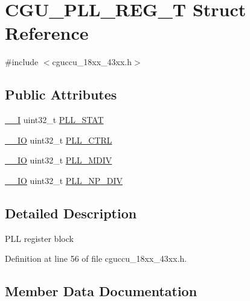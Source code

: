 \hypertarget{struct_c_g_u___p_l_l___r_e_g___t}{}\section{C\+G\+U\+\_\+\+P\+L\+L\+\_\+\+R\+E\+G\+\_\+T Struct Reference}
\label{struct_c_g_u___p_l_l___r_e_g___t}


{\ttfamily \#include $<$cguccu\+\_\+18xx\+\_\+43xx.\+h$>$}

\subsection*{Public Attributes}
\begin{DoxyCompactItemize}
\item 
\hyperlink{core__sc300_8h_af63697ed9952cc71e1225efe205f6cd3}{\+\_\+\+\_\+I} uint32\+\_\+t \hyperlink{struct_c_g_u___p_l_l___r_e_g___t_ae0ecd7bd027d8befd5feadd3ec410c52}{P\+L\+L\+\_\+\+S\+T\+AT}
\item 
\hyperlink{core__sc300_8h_aec43007d9998a0a0e01faede4133d6be}{\+\_\+\+\_\+\+IO} uint32\+\_\+t \hyperlink{struct_c_g_u___p_l_l___r_e_g___t_a4f89fde60595e2d4e8d8d790a2ca3322}{P\+L\+L\+\_\+\+C\+T\+RL}
\item 
\hyperlink{core__sc300_8h_aec43007d9998a0a0e01faede4133d6be}{\+\_\+\+\_\+\+IO} uint32\+\_\+t \hyperlink{struct_c_g_u___p_l_l___r_e_g___t_a7ac1589cbf991bec0eaca0653bef076e}{P\+L\+L\+\_\+\+M\+D\+IV}
\item 
\hyperlink{core__sc300_8h_aec43007d9998a0a0e01faede4133d6be}{\+\_\+\+\_\+\+IO} uint32\+\_\+t \hyperlink{struct_c_g_u___p_l_l___r_e_g___t_a9f0e5bb2892c8c6cf183d3c58400d889}{P\+L\+L\+\_\+\+N\+P\+\_\+\+D\+IV}
\end{DoxyCompactItemize}


\subsection{Detailed Description}
P\+LL register block 

Definition at line 56 of file cguccu\+\_\+18xx\+\_\+43xx.\+h.



\subsection{Member Data Documentation}
\mbox{\label{struct_c_g_u___p_l_l___r_e_g___t_a4f89fde60595e2d4e8d8d790a2ca3322}} 
